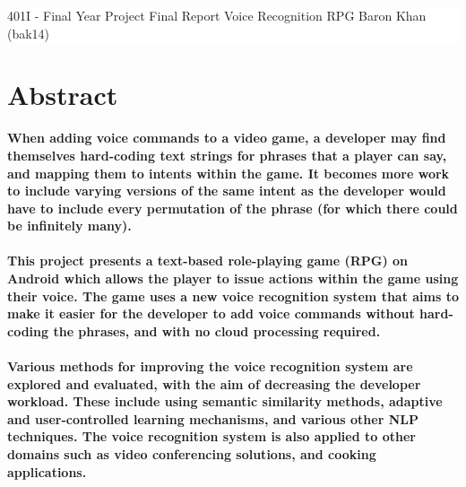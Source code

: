 \documentclass[12pt]{article}
\date{16 March 2017}
\begin{document}
\vspace*{6cm}
\colorbox{white}{
	\parbox[t]{1.0\linewidth}{
		\centering \fontsize{50pt}{80pt}\selectfont %
		\vspace*{0.7cm} %

		{401I - Final Year Project} \break
		\vspace*{0.7cm}
		Final Report
		\break
		Voice Recognition RPG
		\break
		Baron Khan (bak14)
		\vspace*{0.7cm} %
	}
}
\vfill %




\newpage
\thispagestyle{empty}
\tableofcontents
\newpage
\setcounter{page}{1}
\section{Abstract}

\textbf{When adding voice commands to a video game, a developer may find themselves hard-coding text strings for phrases that a player can say, and mapping them to intents within the game. It becomes more work to include varying versions of the same intent as the developer would have to include every permutation of the phrase (for which there could be infinitely many).
\\
\\
This project presents a text-based role-playing game (RPG) on Android which allows the player to issue actions within the game using their voice. The game uses a new voice recognition system that aims to make it easier for the developer to add voice commands without hard-coding the phrases, and with no cloud processing required.
\\
\\
Various methods for improving the voice recognition system are explored and evaluated, with the aim of decreasing the developer workload. These include using semantic similarity methods, adaptive and user-controlled learning mechanisms, and various other NLP techniques. The voice recognition system is also applied to other domains such as video conferencing solutions, and cooking applications.}

\newpage
\end{document}
